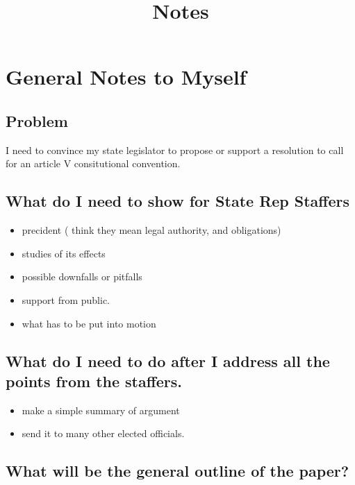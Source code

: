 \documentclass[11pt]{article} %
\title{Notes}
\begin{document}
\section{General Notes to Myself}

\subsection{Problem}
I need to convince my state legislator to propose or support a resolution to call for an article V consitutional convention.

\subsection{What do I need to show for State Rep Staffers}

\begin{itemize}

 \item precident ( think they mean legal authority, and obligations)

\item studies of its effects

\item possible downfalls or pitfalls

\item support from public.

\item what has to be put into motion 

\end{itemize}

\subsection{What do I need to do after I address all the points from the staffers.}

\begin{itemize}

\item make a simple summary of argument

 \item send it to many other elected officials.

\end{itemize}

\subsection{What will be the general outline of the paper?}
\end{document}
